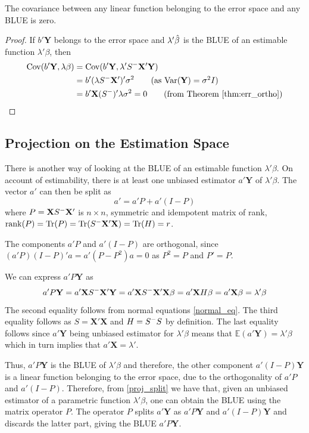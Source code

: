 \documentclass[10pt, a4paper]{article}
\begin{document}
\begin{theorem}
The covariance between any linear function belonging to the error space and any BLUE is zero.
\end{theorem}

\begin{proof}
If \( b'\mathbf{Y} \) belongs to the error space and \( \lambda'\hat{\beta} \) is the BLUE of an estimable function \( \lambda'\beta \), then 
\begin{align*}
	\Cov(b'\mathbf{Y}, \lambda\beta) &= \Cov(b'\mathbf{Y}, \lambda'\ginv{S}\mathbf{X}'\mathbf{Y}) \\
				&= b'(\lambda\ginv{S}\mathbf{X}')' \sigma^{2} \tag*{(as \( \Var(\mathbf{Y}) = \sigma^{2}I \))} \\
				&= b'\mathbf{X}(\ginv{S})'\lambda\sigma^{2} = 0 \tag*{(from Theorem~\ref{thm:err_ortho})}
\end{align*}
\end{proof}

\subsection{Projection on the Estimation Space}
There is another way of looking at the BLUE of an estimable function \( \lambda'\beta \). On account of estimability, there is at least one unbiased estimator \( a'\mathbf{Y} \) of \( \lambda'\beta \). The vector \( a' \) can then be split as 
\[ a' = a'P + a'(I-P) \label{proj_split}\] 
where \( P = \mathbf{X}S^{-}\mathbf{X}' \) is \( n \times n \), symmetric and idempotent matrix of rank, \( \operatorname{rank}(P) = \operatorname{Tr}(P) = \operatorname{Tr}(S^{-}\mathbf{X}'\mathbf{X}) = \operatorname{Tr}(H) = r \).

The components \( a'P \) and \( a'(I-P) \) are orthogonal, since \( (a'P)(I-P)'a = a'(P-P^{2})a = 0 \) as \( P^{2} = P \) and \( P' = P \).

We can express \( a'P \mathbf{Y} \) as
\[ a'P \mathbf{Y} = a' \mathbf{X}S^{-}\mathbf{X}'\mathbf{Y} = a' \mathbf{X} S^{-} \mathbf{X}'\mathbf{X}\beta = a'\mathbf{X}H\beta = a'\mathbf{X}\beta = \lambda'\beta \] 
The second equality follows from normal equations \eqref{normal_eq}. The third equality follows as \( S = \mathbf{X}'\mathbf{X} \) and \( H = S^{-}S \) by definition. The last equality follows since \( a'\mathbf{Y} \) being unbiased estimator for \( \lambda'\beta \) means that \( \mathbb{E}(a'\mathbf{Y}) = \lambda'\beta \) which in turn implies that \( a'\mathbf{X} = \lambda' \).

Thus, \( a'P \mathbf{Y} \) is the BLUE of \( \lambda'\beta \) and therefore, the other component \( a'(I-P)\mathbf{Y} \) is a linear function belonging to the error space, due to the orthogonality of \( a'P \) and \( a'(I-P) \).
Therefore, from \eqref{proj_split} we have that, given an unbiased estimator of a parametric function \( \lambda'\beta \), one can obtain the BLUE using the matrix operator \( P \).
The operator \( P \) splits \( a'\mathbf{Y} \) as \( a'P \mathbf{Y} \) and \( a'(I-P)\mathbf{Y} \) and discards the latter part, giving the BLUE \( a'P \mathbf{Y} \).
\end{document}
